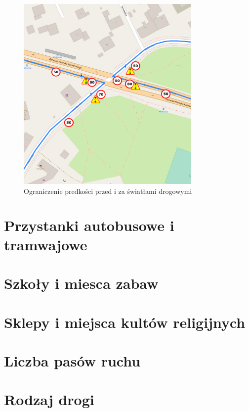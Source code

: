 \begin{figure}[h]
\caption{Ograniczenie predkości przed i za światłami drogowymi}
\label{sec:znakiSwiatla}
\centering
\includegraphics[width=0.8\textwidth]{speedBeforeSignals}
\end{figure}

\newpage
\section{Przystanki autobusowe i tramwajowe}
\label{sec:zakręty}

\newpage
\section{Szkoły i miesca zabaw}
\label{sec:zakręty}

\newpage
\section{Sklepy i miejsca kultów religijnych}
\label{sec:zakręty}

\newpage
\section{Liczba pasów ruchu}
\label{sec:zakręty}

\newpage
\section{Rodzaj drogi}
\label{sec:zakręty}

